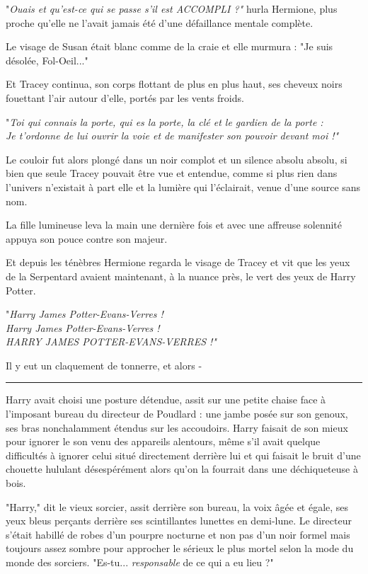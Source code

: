 "\emph{Ouais et qu'est-ce qui se passe s'il est ACCOMPLI ?"}  hurla Hermione, plus proche qu'elle ne l'avait jamais été d'une défaillance mentale complète.

Le visage de Susan était blanc comme de la craie et elle murmura : "Je suis désolée, Fol-Oeil..."

Et Tracey continua, son corps flottant de plus en plus haut, ses cheveux noirs fouettant l'air autour d'elle, portés par les vents froids.

"\emph{Toi qui connais la porte, qui es la porte, la clé et le gardien de la porte :} \\\emph{} \emph{Je t'ordonne de lui ouvrir la voie et de manifester son pouvoir devant moi !"} 

Le couloir fut alors plongé dans un noir complot et un silence absolu absolu, si bien que seule Tracey pouvait être vue et entendue, comme si plus rien dans l'univers n'existait à part elle et la lumière qui l'éclairait, venue d'une source sans nom.

La fille lumineuse leva la main une dernière fois et avec une affreuse solennité appuya son pouce contre son majeur.

Et depuis les ténèbres Hermione regarda le visage de Tracey et vit que les yeux de la Serpentard avaient maintenant, à la nuance près, le vert des yeux de Harry Potter.

"\emph{Harry James Potter-Evans-Verres !} \\\emph{} \emph{Harry James Potter-Evans-Verres !} \\\emph{} \emph{HARRY JAMES POTTER-EVANS-VERRES !"} 

Il y eut un claquement de tonnerre, et alors -
\par\noindent\rule{\textwidth}{0.4pt}
Harry avait choisi une posture détendue, assit sur une petite chaise face à l'imposant bureau du directeur de Poudlard : une jambe posée sur son genoux, ses bras nonchalamment étendus sur les accoudoirs. Harry faisait de son mieux pour ignorer le son venu des appareils alentours, même s'il avait quelque difficultés à ignorer celui situé directement derrière lui et qui faisait le bruit d'une chouette hululant désespérément alors qu'on la fourrait dans une déchiqueteuse à bois.

"Harry," dit le vieux sorcier, assit derrière son bureau, la voix âgée et égale, ses yeux bleus perçants derrière ses scintillantes lunettes en demi-lune. Le directeur s'était habillé de robes d'un pourpre nocturne et non pas d'un noir formel mais toujours assez sombre pour approcher le sérieux le plus mortel selon la mode du monde des sorciers. "Es-tu... \emph{responsable}  de ce qui a eu lieu ?"


